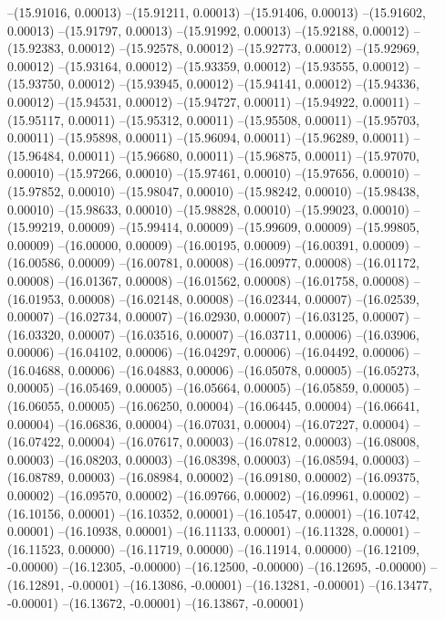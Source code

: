 --(15.91016, 0.00013)
--(15.91211, 0.00013)
--(15.91406, 0.00013)
--(15.91602, 0.00013)
--(15.91797, 0.00013)
--(15.91992, 0.00013)
--(15.92188, 0.00012)
--(15.92383, 0.00012)
--(15.92578, 0.00012)
--(15.92773, 0.00012)
--(15.92969, 0.00012)
--(15.93164, 0.00012)
--(15.93359, 0.00012)
--(15.93555, 0.00012)
--(15.93750, 0.00012)
--(15.93945, 0.00012)
--(15.94141, 0.00012)
--(15.94336, 0.00012)
--(15.94531, 0.00012)
--(15.94727, 0.00011)
--(15.94922, 0.00011)
--(15.95117, 0.00011)
--(15.95312, 0.00011)
--(15.95508, 0.00011)
--(15.95703, 0.00011)
--(15.95898, 0.00011)
--(15.96094, 0.00011)
--(15.96289, 0.00011)
--(15.96484, 0.00011)
--(15.96680, 0.00011)
--(15.96875, 0.00011)
--(15.97070, 0.00010)
--(15.97266, 0.00010)
--(15.97461, 0.00010)
--(15.97656, 0.00010)
--(15.97852, 0.00010)
--(15.98047, 0.00010)
--(15.98242, 0.00010)
--(15.98438, 0.00010)
--(15.98633, 0.00010)
--(15.98828, 0.00010)
--(15.99023, 0.00010)
--(15.99219, 0.00009)
--(15.99414, 0.00009)
--(15.99609, 0.00009)
--(15.99805, 0.00009)
--(16.00000, 0.00009)
--(16.00195, 0.00009)
--(16.00391, 0.00009)
--(16.00586, 0.00009)
--(16.00781, 0.00008)
--(16.00977, 0.00008)
--(16.01172, 0.00008)
--(16.01367, 0.00008)
--(16.01562, 0.00008)
--(16.01758, 0.00008)
--(16.01953, 0.00008)
--(16.02148, 0.00008)
--(16.02344, 0.00007)
--(16.02539, 0.00007)
--(16.02734, 0.00007)
--(16.02930, 0.00007)
--(16.03125, 0.00007)
--(16.03320, 0.00007)
--(16.03516, 0.00007)
--(16.03711, 0.00006)
--(16.03906, 0.00006)
--(16.04102, 0.00006)
--(16.04297, 0.00006)
--(16.04492, 0.00006)
--(16.04688, 0.00006)
--(16.04883, 0.00006)
--(16.05078, 0.00005)
--(16.05273, 0.00005)
--(16.05469, 0.00005)
--(16.05664, 0.00005)
--(16.05859, 0.00005)
--(16.06055, 0.00005)
--(16.06250, 0.00004)
--(16.06445, 0.00004)
--(16.06641, 0.00004)
--(16.06836, 0.00004)
--(16.07031, 0.00004)
--(16.07227, 0.00004)
--(16.07422, 0.00004)
--(16.07617, 0.00003)
--(16.07812, 0.00003)
--(16.08008, 0.00003)
--(16.08203, 0.00003)
--(16.08398, 0.00003)
--(16.08594, 0.00003)
--(16.08789, 0.00003)
--(16.08984, 0.00002)
--(16.09180, 0.00002)
--(16.09375, 0.00002)
--(16.09570, 0.00002)
--(16.09766, 0.00002)
--(16.09961, 0.00002)
--(16.10156, 0.00001)
--(16.10352, 0.00001)
--(16.10547, 0.00001)
--(16.10742, 0.00001)
--(16.10938, 0.00001)
--(16.11133, 0.00001)
--(16.11328, 0.00001)
--(16.11523, 0.00000)
--(16.11719, 0.00000)
--(16.11914, 0.00000)
--(16.12109, -0.00000)
--(16.12305, -0.00000)
--(16.12500, -0.00000)
--(16.12695, -0.00000)
--(16.12891, -0.00001)
--(16.13086, -0.00001)
--(16.13281, -0.00001)
--(16.13477, -0.00001)
--(16.13672, -0.00001)
--(16.13867, -0.00001)
